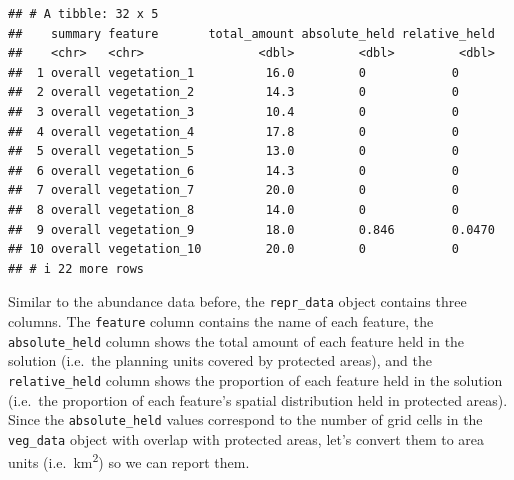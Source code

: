 \documentclass[12pt,]{book}
\newenvironment{Shaded}{\begin{snugshade}}{\end{snugshade}}
\newcommand{\CommentTok}[1]{\textcolor[rgb]{0.56,0.35,0.01}{\textit{#1}}}
\newcommand{\DecValTok}[1]{\textcolor[rgb]{0.00,0.00,0.81}{#1}}
\newcommand{\KeywordTok}[1]{\textcolor[rgb]{0.13,0.29,0.53}{\textbf{#1}}}
\newcommand{\NormalTok}[1]{#1}
\newcommand{\OperatorTok}[1]{\textcolor[rgb]{0.81,0.36,0.00}{\textbf{#1}}}
\newcommand{\StringTok}[1]{\textcolor[rgb]{0.31,0.60,0.02}{#1}}
\begin{document}
\begin{verbatim}
## # A tibble: 32 x 5
##    summary feature       total_amount absolute_held relative_held
##    <chr>   <chr>                <dbl>         <dbl>         <dbl>
##  1 overall vegetation_1          16.0         0            0     
##  2 overall vegetation_2          14.3         0            0     
##  3 overall vegetation_3          10.4         0            0     
##  4 overall vegetation_4          17.8         0            0     
##  5 overall vegetation_5          13.0         0            0     
##  6 overall vegetation_6          14.3         0            0     
##  7 overall vegetation_7          20.0         0            0     
##  8 overall vegetation_8          14.0         0            0     
##  9 overall vegetation_9          18.0         0.846        0.0470
## 10 overall vegetation_10         20.0         0            0     
## # i 22 more rows
\end{verbatim}

Similar to the abundance data before, the \texttt{repr\_data} object contains three columns. The \texttt{feature} column contains the name of each feature, the \texttt{absolute\_held} column shows the total amount of each feature held in the solution (i.e.~the planning units covered by protected areas), and the \texttt{relative\_held} column shows the proportion of each feature held in the solution (i.e.~the proportion of each feature's spatial distribution held in protected areas). Since the \texttt{absolute\_held} values correspond to the number of grid cells in the \texttt{veg\_data} object with overlap with protected areas, let's convert them to area units (i.e.~km\textsuperscript{2}) so we can report them.

\begin{Shaded}
\end{Shaded}
\end{document}
